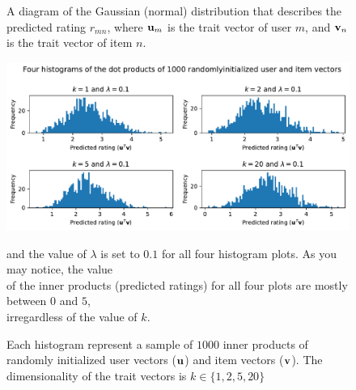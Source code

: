 \documentclass{article}
\begin{document}
\begin{figure}[h!]
    \centering
    \captionsetup{justification=centering}
    \caption{A diagram of the Gaussian (normal) distribution that describes the predicted rating $r_{mn}$,
    where $\vb{u}_m$ is the trait vector of user $m$, and $\vb{v}_n$ is the trait vector of item $n$.}
    \label{gauss}
\end{figure}

\begin{figure}[h!]
    \centering
    \captionsetup{justification=centering}
    \includegraphics[width=1\textwidth]{graphics/histograms.pdf}
    \caption{Each histogram represent a sample of $1000$ inner products of randomly initialized user vectors ($\vb{u}$) and item vectors ($\vb{v}$).
    The dimensionality of the trait vectors is $k \in \{1, 2, 5, 20\}$} and the value of $\lambda$ is set to $0.1$ for all four histogram plots.
    As you may notice, the value \\of the inner products (predicted ratings) for all four plots are mostly between $0$ and $5$, \\irregardless of the value of $k$.
    \label{hist}
\end{figure}
\end{document}
